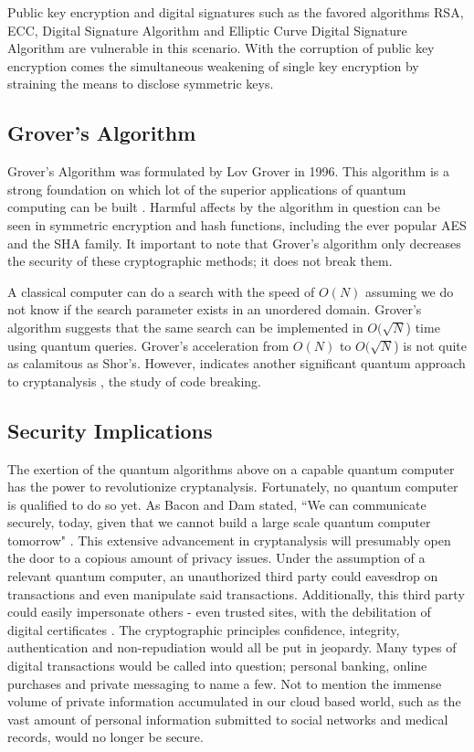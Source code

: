 Public key encryption and digital signatures such as the favored algorithms RSA, ECC, Digital Signature Algorithm and Elliptic Curve Digital Signature Algorithm are vulnerable in this scenario. With the corruption of public key encryption comes the simultaneous weakening of single key encryption by straining the means to disclose symmetric keys.

\subsection{Grover's Algorithm}
Grover's Algorithm was formulated by Lov Grover in 1996. This algorithm is a strong foundation on which lot of the superior applications of quantum computing can be built \cite{Post_Q_Cryptog}. Harmful affects by the algorithm in question can be seen in symmetric encryption and hash functions, including the ever popular AES and the SHA family. It important to note that Grover's algorithm only decreases the security of these cryptographic methods; it does not break them.

A classical computer can do a search with the speed of \(O(N)\) assuming we do not know if the search parameter exists in an unordered domain. Grover's algorithm suggests that the same search can be implemented in \(O(\sqrt{N}\)) time using quantum queries. Grover's acceleration from \(O(N)\) to \(O(\sqrt{N}\)) is not quite as calamitous as Shor's. However, indicates another significant quantum approach to cryptanalysis \cite{Quantum_Cryptanal}, the study of code breaking. 

\subsection{Security Implications}
The exertion of the quantum algorithms above on a capable quantum computer has the power to revolutionize cryptanalysis. Fortunately, no quantum computer is qualified to do so yet. As Bacon and Dam stated, ``We can communicate securely, today, given that we cannot build a large scale quantum computer tomorrow" \cite{Q_Alg}. This extensive advancement in cryptanalysis will presumably open the door to a copious amount of privacy issues. Under the assumption of a relevant quantum computer, an unauthorized third party could eavesdrop on transactions and even manipulate said transactions. Additionally, this third party could easily impersonate others - even trusted sites, with the debilitation of digital certificates \cite{Sec_Risk}. The cryptographic principles confidence, integrity, authentication and non-repudiation would all be put in jeopardy. Many types of digital transactions would be called into question; personal banking, online purchases and private messaging to name a few. Not to mention the immense volume of private information accumulated in our cloud based world, such as the vast amount of personal information submitted to social networks and medical records, would no longer be secure. 

